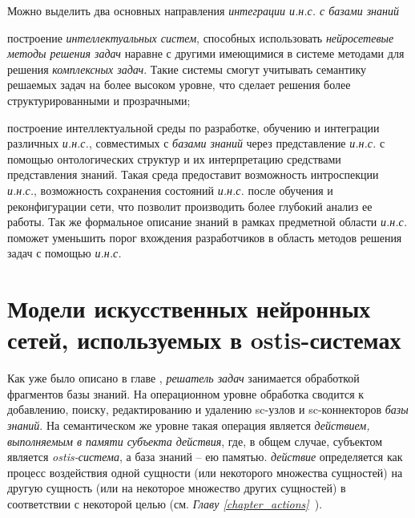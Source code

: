 Можно выделить два основных направления \textit{интеграции и.н.с. с базами знаний} \:
\begin{textitemize}
	\item построение \textit{интеллектуальных систем}, способных использовать \textit{нейросетевые методы решения задач} наравне с другими имеющимися в системе методами для решения \textit{комплексных задач}. Такие системы смогут учитывать семантику решаемых задач на более высоком уровне, что сделает решения более структурированными и прозрачными;
	\item построение интеллектуальной среды по разработке, обучению и интеграции различных \textit{и.н.с.}, совместимых с \textit{базами знаний} через представление \textit{и.н.с.} с помощью онтологических структур и их интерпретацию средствами представления знаний. Такая среда предоставит возможность интроспекции \textit{и.н.с.}, возможность сохранения состояний \textit{и.н.с.} после обучения и реконфигурации сети, что позволит производить более глубокий анализ ее работы. Так же формальное описание знаний в рамках предметной области \textit{и.н.с.} поможет уменьшить порог вхождения разработчиков в область методов решения задач с помощью \textit{и.н.с.}
\end{textitemize}


\section{Модели искусственных нейронных сетей, используемых в ostis-системах}
\label{sec_chapter_ann_models}

Как уже было описано в главе , \textit{решатель задач} занимается обработкой фрагментов базы знаний. На операционном уровне обработка сводится к добавлению, поиску, редактированию и удалению sc-узлов и sc-коннекторов \textit{базы знаний}. На семантическом же уровне такая операция является \textit{действием, выполняемым в памяти субъекта действия}, где, в общем случае, субъектом является \textit{ostis-система}, а база знаний -- ею памятью. \textit{действие} определяется как процесс воздействия одной сущности (или некоторого множества сущностей) на другую сущность (или на некоторое множество других сущностей) в соответствии с некоторой целью (см. \textit{Главу \ref{chapter_actions}~}).

